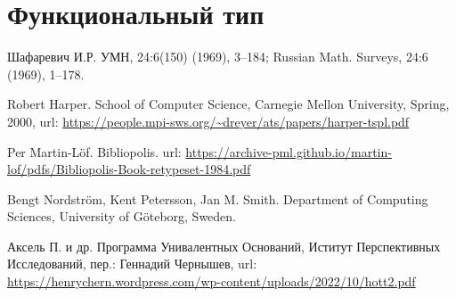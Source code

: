 \documentclass[openany]{book}
\theoremstyle{plain}
\theoremstyle{definition}
\begin{document}
\section{Функциональный тип}

\begin{thebibliography}{2}

    Шафаревич И.Р.
    \newblock УМН, 24:6(150) (1969), 3–184; Russian Math. Surveys, 24:6 (1969), 1–178.

    Robert Harper.
    \newblock School of Computer Science, Carnegie Mellon University, Spring, 2000,
    \newblock url: \url{https://people.mpi-sws.org/~dreyer/ats/papers/harper-tspl.pdf}

    Per Martin-L\"{o}f.
    \newblock Bibliopolis.
    \newblock url: \url{https://archive-pml.github.io/martin-lof/pdfs/Bibliopolis-Book-retypeset-1984.pdf}

    Bengt Nordstr\"{o}m, Kent Petersson, Jan M. Smith.
    \newblock Department of Computing Sciences, University of G\"{o}teborg, Sweden.

    \bibitem{}
    Аксель П. и др.
    \newblock Программа Унивалентных Оснований, Иститут Перспективных Исследований, пер.: Геннадий Чернышев,
    \newblock url: \url{https://henrychern.wordpress.com/wp-content/uploads/2022/10/hott2.pdf}

\end{thebibliography}
\end{document}
